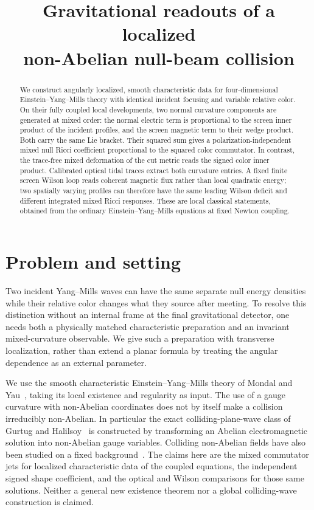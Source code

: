 \documentclass[11pt]{article}
\title{Gravitational readouts of a localized\\ non-Abelian null-beam collision}
\author{}
\date{}
\begin{document}
\maketitle

\begin{abstract}
We construct angularly localized, smooth characteristic data for four-dimensional Einstein--Yang--Mills theory with identical incident focusing and variable relative color. On their fully coupled local developments, two normal curvature components are generated at mixed order: the normal electric term is proportional to the screen inner product of the incident profiles, and the screen magnetic term to their wedge product. Both carry the same Lie bracket. Their squared sum gives a polarization-independent mixed null Ricci coefficient proportional to the squared color commutator. In contrast, the trace-free mixed deformation of the cut metric reads the signed color inner product. Calibrated optical tidal traces extract both curvature entries. A fixed finite screen Wilson loop reads coherent magnetic flux rather than local quadratic energy; two spatially varying profiles can therefore have the same leading Wilson deficit and different integrated mixed Ricci responses. These are local classical statements, obtained from the ordinary Einstein--Yang--Mills equations at fixed Newton coupling.
\end{abstract}

\section{Problem and setting}

Two incident Yang--Mills waves can have the same separate null energy densities while their relative color changes what they source after meeting. To resolve this distinction without an internal frame at the final gravitational detector, one needs both a physically matched characteristic preparation and an invariant mixed-curvature observable. We give such a preparation with transverse localization, rather than extend a planar formula by treating the angular dependence as an external parameter.

We use the smooth characteristic Einstein--Yang--Mills theory of Mondal and Yau~\cite{MY}, taking its local existence and regularity as input. The use of a gauge curvature with non-Abelian coordinates does not by itself make a collision irreducibly non-Abelian. In particular the exact colliding-plane-wave class of Gurtug and Halilsoy~\cite{GH} is constructed by transforming an Abelian electromagnetic solution into non-Abelian gauge variables. Colliding non-Abelian fields have also been studied on a fixed background~\cite{YMPlane}. The claims here are the mixed commutator jets for localized characteristic data of the coupled equations, the independent signed shape coefficient, and the optical and Wilson comparisons for those same solutions. Neither a general new existence theorem nor a global colliding-wave construction is claimed.
\end{document}
